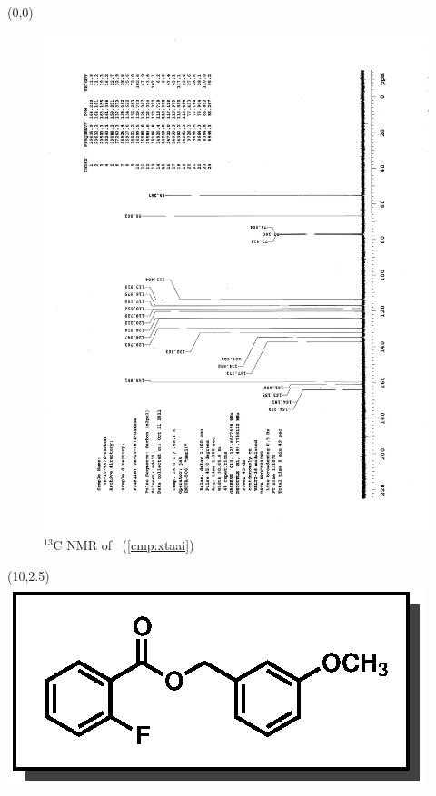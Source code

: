 \clearpage
\begin{textblock}{20}(0,0)
\begin{figure}[htb]
\caption{$^{13}$C NMR of  \CMPxtaai\ (\ref{cmp:xtaai})}
\includegraphics[scale=0.75, trim = 0mm 0mm 0mm 5mm,
clip]{chp_asymmetric/images/nmr/xtaaiC}
\vspace{-100pt}
\end{figure}
\end{textblock}
\begin{textblock}{1}(10,2.5)
\includegraphics[scale=0.8, angle=90]{chp_asymmetric/images/xtaai}
\end{textblock}

